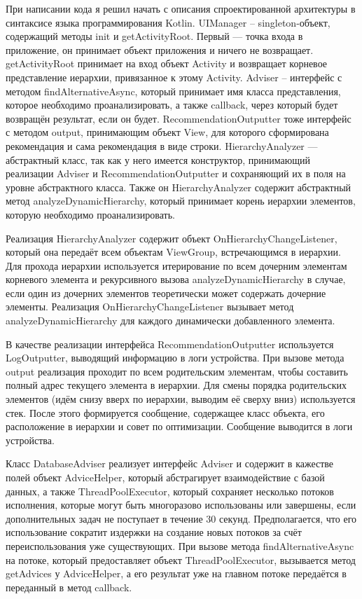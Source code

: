 \documentclass[a4paper,14pt]{extarticle} %
\begin{document}
	При написании кода я решил начать с описания спроектированной архитектуры в синтаксисе языка программирования Kotlin. UIManager – singleton-объект, содержащий методы init и getActivityRoot. Первый —  точка входа в приложение, он принимает объект приложения и ничего не возвращает. getActivityRoot принимает на вход объект Activity и возвращает корневое представление иерархии, привязанное к этому Activity. Adviser – интерфейс с методом findAlternativeAsync, который принимает имя класса представления, которое необходимо проанализировать, а также callback, через который будет возвращён результат, если он будет. RecommendationOutputter тоже интерфейс с методом output, принимающим объект View, для которого сформирована рекомендация и сама рекомендация в виде строки. HierarchyAnalyzer —  абстрактный класс, так как у него имеется конструктор, принимающий реализации Adviser и RecommendationOutputter и сохраняющий их в поля на уровне абстрактного класса. Также он HierarchyAnalyzer содержит абстрактный метод analyzeDynamicHierarchy, который принимает корень иерархии элементов, которую необходимо проанализировать.
	
	Реализация HierarchyAnalyzer содержит объект OnHierarchyChangeListener, который она передаёт всем объектам ViewGroup, встречающимся в иерархии. Для прохода иерархии используется итерирование по всем дочерним элементам корневого элемента и рекурсивного вызова analyzeDynamicHierarchy в случае, если один из дочерних элементов теоретически может содержать дочерние элементы. Реализация OnHierarchyChangeListener вызывает метод analyzeDynamicHierarchy для каждого динамически добавленного элемента.
	
	В качестве реализации интерфейса RecommendationOutputter используется LogOutputter, выводящий информацию в логи устройства. При вызове метода output реализация проходит по всем родительским элементам, чтобы составить полный адрес текущего элемента в иерархии. Для смены порядка родительских элементов (идём снизу вверх по иерархии, выводим её сверху вниз) используется стек. После этого формируется сообщение, содержащее класс объекта, его расположение в иерархии и совет по оптимизации. Сообщение выводится в логи устройства.
	
	Класс DatabaseAdviser реализует интерфейс Adviser и содержит в кажестве полей объект AdviceHelper, который абстрагирует взаимодействие с базой данных, а также ThreadPoolExecutor, который сохраняет несколько потоков исполнения, которые могут быть многоразово использованы или завершены, если дополнительных задач не поступает в течение 30 секунд. Предполагается, что его использование сократит издержки на создание новых потоков за счёт переиспользования уже существующих. При вызове метода findAlternativeAsync на потоке, который предоставляет объект ThreadPoolExecutor, вызывается метод getAdvices у AdviceHelper, а его результат уже на главном потоке передаётся в переданный в метод callback.
	
\end{document}
